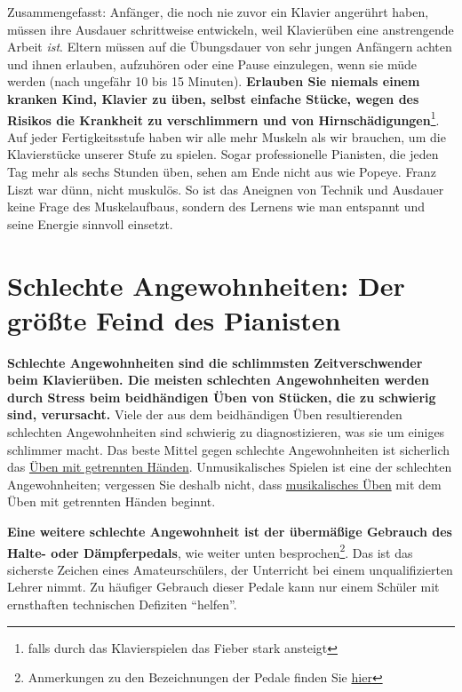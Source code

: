 Zusammengefasst: Anfänger, die noch nie zuvor ein Klavier angerührt haben, müssen ihre Ausdauer schrittweise entwickeln, weil Klavierüben eine anstrengende Arbeit \textit{ist}.
Eltern müssen auf die Übungsdauer von sehr jungen Anfängern achten und ihnen erlauben, aufzuhören oder eine Pause einzulegen, wenn sie müde werden (nach ungefähr 10 bis 15 Minuten).
\textbf{Erlauben Sie niemals einem kranken Kind, Klavier zu üben, selbst einfache Stücke, wegen des Risikos die Krankheit zu verschlimmern und von Hirnschädigungen}\footnote{falls durch das Klavierspielen das Fieber stark ansteigt}.
Auf jeder Fertigkeitsstufe haben wir alle mehr Muskeln als wir brauchen, um die Klavierstücke unserer Stufe zu spielen.
Sogar professionelle Pianisten, die jeden Tag mehr als sechs Stunden üben, sehen am Ende nicht aus wie Popeye.
Franz Liszt war dünn, nicht muskulös.
So ist das Aneignen von Technik und Ausdauer keine Frage des Muskelaufbaus, sondern des Lernens wie man entspannt und seine Energie sinnvoll einsetzt.
 


\section{Schlechte Angewohnheiten: Der größte Feind des Pianisten}\hypertarget{c1ii22}{}

\textbf{Schlechte Angewohnheiten sind die schlimmsten Zeitverschwender beim Klavierüben.
Die meisten schlechten Angewohnheiten werden durch Stress beim beidhändigen Üben von Stücken, die zu schwierig sind, verursacht.}
Viele der aus dem beidhändigen Üben resultierenden schlechten Angewohnheiten sind schwierig zu diagnostizieren, was sie um einiges schlimmer macht.
Das beste Mittel gegen schlechte Angewohnheiten ist sicherlich das \hyperlink{c1ii7}{Üben mit getrennten Händen}.
Unmusikalisches Spielen ist eine der schlechten Angewohnheiten; vergessen Sie deshalb nicht, dass \hyperlink{c1iii14d}{musikalisches Üben} mit dem Üben mit getrennten Händen beginnt.

\textbf{Eine weitere schlechte Angewohnheit ist der übermäßige Gebrauch des Halte- oder Dämpferpedals}, wie weiter unten besprochen\footnote{Anmerkungen zu den Bezeichnungen der Pedale finden Sie \hyperlink{Pedale}{hier}}.
Das ist das sicherste Zeichen eines Amateurschülers, der Unterricht bei einem unqualifizierten Lehrer nimmt.
Zu häufiger Gebrauch dieser Pedale kann nur einem Schüler mit ernsthaften technischen Defiziten \enquote{helfen}.

